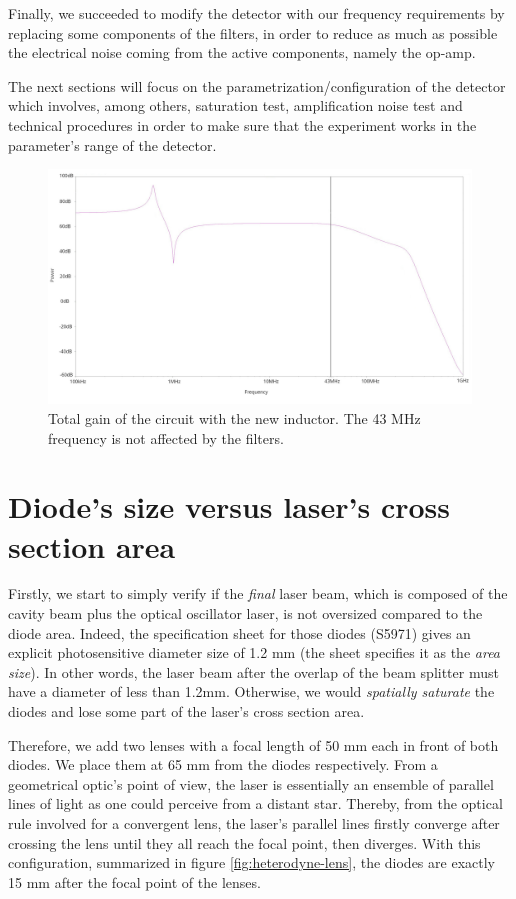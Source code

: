 \documentclass[11pt]{report}
\begin{document}
Finally, we succeeded to modify the detector with our frequency requirements by replacing some components of the filters, in order to reduce as much as possible the electrical noise coming from the active components, namely the op-amp.

The next sections will focus on the parametrization/configuration of the detector which involves, among others, saturation test, amplification noise test and technical procedures in order to make sure that the experiment works in the parameter's range of the detector.

\begin{figure}[h!]
\centering
\includegraphics[width=\textwidth]{total_gain_new}
\caption{Total gain of the circuit with the new inductor. The 43 MHz frequency is not affected by the filters.}
\label{fig:total_gain_new}
\end{figure}

\section{Diode's size versus laser's cross section area}

Firstly, we start to simply verify if the \textit{final} laser beam, which is composed of the cavity beam plus the optical oscillator laser, is not oversized compared to the diode area. Indeed, the specification sheet for those diodes (S5971) gives an explicit photosensitive diameter size of 1.2 mm (the sheet specifies it as the \textit{area size}). In other words, the laser beam after the overlap of the beam splitter must have a diameter of less than 1.2mm. Otherwise, we would \textit{spatially saturate} the diodes and lose some part of the laser's cross section area.

Therefore, we add two lenses with a focal length of 50 mm each in front of both diodes. We place them at 65 mm from the diodes respectively. From a geometrical optic's point of view, the laser is essentially an ensemble of parallel lines of light as one could perceive from a distant star. Thereby, from the optical rule involved for a convergent lens, the laser's parallel lines firstly converge after crossing the lens until they all reach the focal point, then diverges. With this configuration, summarized in figure \ref{fig:heterodyne-lens}, the diodes are exactly 15 mm after the focal point of the lenses. 
\end{document}
